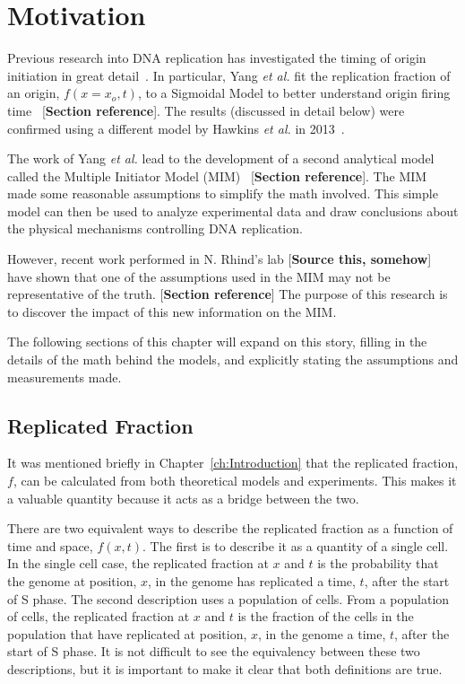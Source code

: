 \chapter{Motivation}
\label{ch:Motivation}

Previous research into DNA replication has investigated the timing of origin initiation in great detail~\cite{ScottsPaper,Bechhoefer2012374,deMouraModel1,deMouraModel2,StochasticTermination}.
In particular, Yang \emph{et al.} fit the replication fraction of an origin, $f(x=x_o,t)$, to a Sigmoidal Model to better understand origin firing time~\cite{ScottsPaper} [\textbf{Section reference}].
The results (discussed in detail below) were confirmed using a different model by Hawkins \emph{et al.} in 2013~\cite{StochasticTermination}.

The work of Yang \emph{et al.} lead to the development of a second analytical model called the Multiple Initiator Model (MIM)~\cite{ScottsPaper} [\textbf{Section reference}].
The MIM made some reasonable assumptions to simplify the math involved.
This simple model can then be used to analyze experimental data and draw conclusions about the physical mechanisms controlling DNA replication.

However, recent work performed in N. Rhind's lab [\textbf{Source this, somehow}] have shown that one of the assumptions used in the MIM may not be representative of the truth. [\textbf{Section reference}]
The purpose of this research is to discover the impact of this new information on the MIM.

The following sections of this chapter will expand on this story, filling in the details of the math behind the models, and explicitly stating the assumptions and measurements made.


	\section{Replicated Fraction}
	\label{sec:ReplicatedFraction}
	
	It was mentioned briefly in Chapter~\ref{ch:Introduction} that the replicated fraction, $f$, can be calculated from both theoretical models and experiments.
	This makes it a valuable quantity because it acts as a bridge between the two.
	
	There are two equivalent ways to describe the replicated fraction as a function of time and space, $f(x,t)$.
	The first is to describe it as a quantity of a single cell.
	In the single cell case, the replicated fraction at $x$ and $t$ is the probability that the genome at position, $x$, in the genome has replicated a time, $t$, after the start of S phase.
	The second description uses a population of cells.
	From a population of cells, the replicated fraction at $x$ and $t$ is the fraction of the cells in the population that have replicated at position, $x$, in the genome a time, $t$, after the start of S phase.
	It is not difficult to see the equivalency between these two descriptions, but it is important to make it clear that both definitions are true.
	
